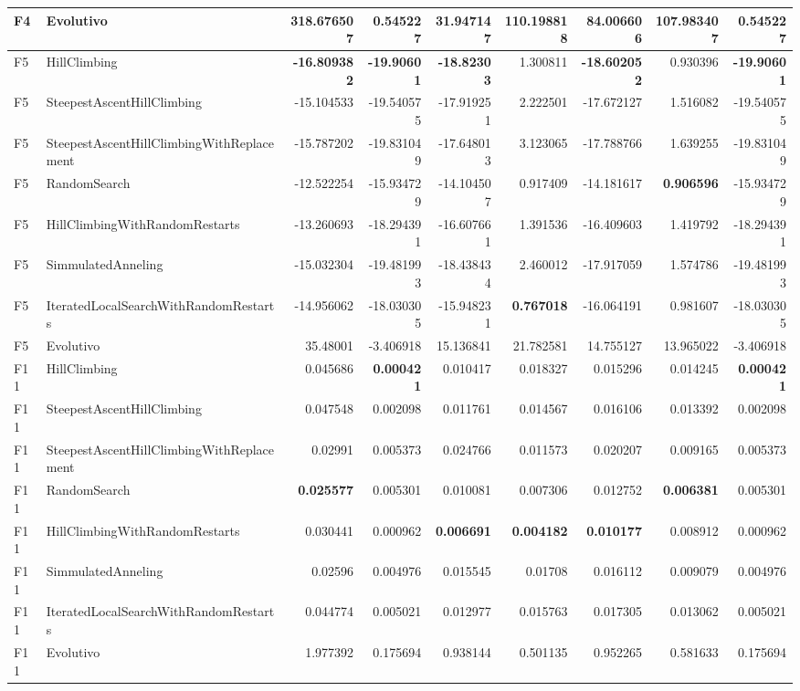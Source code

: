 \begin{tabular}{llrrrrrrr}
F4 & Evolutivo & 318.676507 & 0.545227 & 31.947147 & 110.198818 & 84.006606 & 107.983407 & 0.545227 \\ 
\midrule
F5 & HillClimbing & \textbf{-16.809382} & \textbf{-19.90601} & \textbf{-18.82303} & 1.300811 & \textbf{-18.602052} & 0.930396 & \textbf{-19.90601} \\ 
F5 & SteepestAscentHillClimbing & -15.104533 & -19.540575 & -17.919251 & 2.222501 & -17.672127 & 1.516082 & -19.540575 \\ 
F5 & SteepestAscentHillClimbingWithReplacement & -15.787202 & -19.831049 & -17.648013 & 3.123065 & -17.788766 & 1.639255 & -19.831049 \\ 
F5 & RandomSearch & -12.522254 & -15.934729 & -14.104507 & 0.917409 & -14.181617 & \textbf{0.906596} & -15.934729 \\ 
F5 & HillClimbingWithRandomRestarts & -13.260693 & -18.294391 & -16.607661 & 1.391536 & -16.409603 & 1.419792 & -18.294391 \\ 
F5 & SimmulatedAnneling & -15.032304 & -19.481993 & -18.438434 & 2.460012 & -17.917059 & 1.574786 & -19.481993 \\ 
F5 & IteratedLocalSearchWithRandomRestarts & -14.956062 & -18.030305 & -15.948231 & \textbf{0.767018} & -16.064191 & 0.981607 & -18.030305 \\ 
F5 & Evolutivo & 35.48001 & -3.406918 & 15.136841 & 21.782581 & 14.755127 & 13.965022 & -3.406918 \\ 
\midrule
F11 & HillClimbing & 0.045686 & \textbf{0.000421} & 0.010417 & 0.018327 & 0.015296 & 0.014245 & \textbf{0.000421} \\ 
F11 & SteepestAscentHillClimbing & 0.047548 & 0.002098 & 0.011761 & 0.014567 & 0.016106 & 0.013392 & 0.002098 \\ 
F11 & SteepestAscentHillClimbingWithReplacement & 0.02991 & 0.005373 & 0.024766 & 0.011573 & 0.020207 & 0.009165 & 0.005373 \\ 
F11 & RandomSearch & \textbf{0.025577} & 0.005301 & 0.010081 & 0.007306 & 0.012752 & \textbf{0.006381} & 0.005301 \\ 
F11 & HillClimbingWithRandomRestarts & 0.030441 & 0.000962 & \textbf{0.006691} & \textbf{0.004182} & \textbf{0.010177} & 0.008912 & 0.000962 \\ 
F11 & SimmulatedAnneling & 0.02596 & 0.004976 & 0.015545 & 0.01708 & 0.016112 & 0.009079 & 0.004976 \\ 
F11 & IteratedLocalSearchWithRandomRestarts & 0.044774 & 0.005021 & 0.012977 & 0.015763 & 0.017305 & 0.013062 & 0.005021 \\ 
F11 & Evolutivo & 1.977392 & 0.175694 & 0.938144 & 0.501135 & 0.952265 & 0.581633 & 0.175694 \\ 
\bottomrule
\end{tabular}
